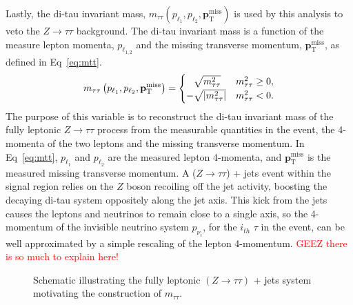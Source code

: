  Lastly, the di-tau invariant mass, $m_{\tau\tau}\left(p_{\ell_1}, p_{\ell_2}, \mathbf{p}_\mathrm{T}^\mathrm{miss}\right) $ is used by this analysis to veto the $Z\rightarrow\tau\tau$ background.  The di-tau invariant mass is a function of the measure lepton momenta, $p_{\ell_{1,2}}$ and the missing transverse momentum, $\mathbf{p}_\mathrm{T}^\mathrm{miss}$, as defined in Eq~\ref{eq:mtt}.
 \begin{equation}
 \label{eq:mtt}
 m_{\tau\tau}\left(p_{\ell_1}, p_{\ell_2}, \mathbf{p}_\mathrm{T}^\mathrm{miss}\right) =
\begin{cases}
\hphantom{-}\sqrt{m_{\tau\tau}^2}               & m_{\tau\tau}^2 \geq 0,\\
 -\sqrt{\left| m_{\tau\tau}^2\right|} & m_{\tau\tau}^2 < 0.
\end{cases} 
 \end{equation}
 The purpose of this variable is to reconstruct the di-tau invariant mass of the fully leptonic $Z\rightarrow\tau\tau$ process from the measurable quantities in the event, the 4-momenta of the two leptons and the missing transverse momentum. In Eq~\ref{eq:mtt}, $p_{\ell_1}$ and $p_{\ell_2}$ are the measured lepton 4-momenta, and $\mathbf{p}_\mathrm{T}^\mathrm{miss}$ is the measured missing transverse momentum.  A ($Z\rightarrow\tau\tau$) + jets event within the signal region relies on the $Z$ boson recoiling off the jet activity, boosting the decaying di-tau system oppositely along the jet axis.  This kick from the jets causes the leptons and neutrinos to remain close to a single axis, so the 4-momentum of the invisible neutrino system $p_{\nu_i}$, for the $i_{th}$ $\tau$ in the event, can be well approximated by a simple rescaling of the lepton 4-momentum.  \textcolor{red}{GEEZ there is so much to explain here!}
  \begin{figure}
  \centering
  
  \caption{Schematic illustrating the fully leptonic $(Z\to\tau\tau)$ + jets system motivating the construction of $m_{\tau\tau}$. }
  \label{fig:ditau_schematic}
  \end{figure}
  
